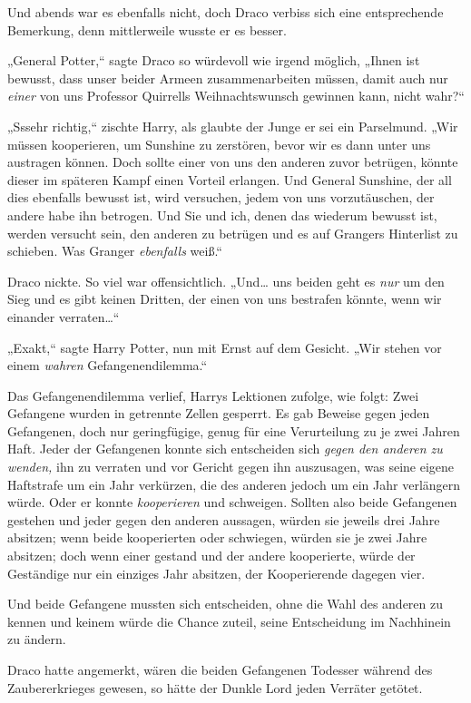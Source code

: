 {Und abends war es ebenfalls nicht, doch Draco verbiss sich eine entsprechende Bemerkung, denn mittlerweile wusste er es besser.

„General Potter,“ sagte Draco so würdevoll wie irgend möglich, „Ihnen ist bewusst, dass unser beider Armeen zusammenarbeiten müssen, damit auch nur \emph{einer} von uns Professor Quirrells Weihnachtswunsch gewinnen kann, nicht wahr?“

„Sssehr richtig,“ zischte Harry, als glaubte der Junge er sei ein Parselmund. „Wir müssen kooperieren, um Sunshine zu zerstören, bevor wir es dann unter uns austragen können. Doch sollte einer von uns den anderen zuvor betrügen, könnte dieser im späteren Kampf einen Vorteil erlangen. Und General Sunshine, der all dies ebenfalls bewusst ist, wird versuchen, jedem von uns vorzutäuschen, der andere habe ihn betrogen. Und Sie und ich, denen das wiederum bewusst ist, werden versucht sein, den anderen zu betrügen und es auf Grangers Hinterlist zu schieben. Was Granger \emph{ebenfalls} weiß.“

Draco nickte. So viel war offensichtlich. „Und… uns beiden geht es \emph{nur} um den Sieg und es gibt keinen Dritten, der einen von uns bestrafen könnte, wenn wir einander verraten…“

„Exakt,“ sagte Harry Potter, nun mit Ernst auf dem Gesicht. „Wir stehen vor einem \emph{wahren} Gefangenendilemma.“

Das Gefangenendilemma verlief, Harrys Lektionen zufolge, wie folgt: Zwei Gefangene wurden in getrennte Zellen gesperrt. Es gab Beweise gegen jeden Gefangenen, doch nur geringfügige, genug für eine Verurteilung zu je zwei Jahren Haft. Jeder der Gefangenen konnte sich entscheiden sich \emph{gegen den anderen zu wenden,} ihn zu verraten und vor Gericht gegen ihn auszusagen, was seine eigene Haftstrafe um ein Jahr verkürzen, die des anderen jedoch um ein Jahr verlängern würde. Oder er konnte \emph{kooperieren} und schweigen. Sollten also beide Gefangenen gestehen und jeder gegen den anderen aussagen, würden sie jeweils drei Jahre absitzen; wenn beide kooperierten oder schwiegen, würden sie je zwei Jahre absitzen; doch wenn einer gestand und der andere kooperierte, würde der Geständige nur ein einziges Jahr absitzen, der Kooperierende dagegen vier.

Und beide Gefangene mussten sich entscheiden, ohne die Wahl des anderen zu kennen und keinem würde die Chance zuteil, seine Entscheidung im Nachhinein zu ändern.

Draco hatte angemerkt, wären die beiden Gefangenen Todesser während des Zaubererkrieges gewesen, so hätte der Dunkle Lord jeden Verräter getötet.

}

